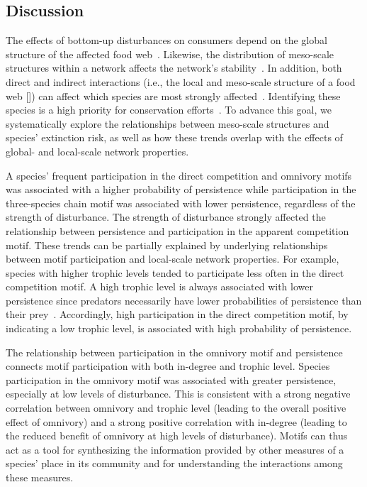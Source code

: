 \documentclass[12pt]{article}
\begin{document}
\begin{spacing}{2.0}
\section*{Discussion}

    The effects of bottom-up disturbances on consumers depend on the global structure of the affected food web~\citep{Dunne2002, Eklof2006, PascualDunne2006}.
    Likewise, the distribution of meso-scale structures within a network affects the network's stability~\citep{prill2005dynamic, bascompte2005simple}.
    In addition, both direct and indirect interactions (i.e., the local and meso-scale structure of a food web  [\citealp[]{Cirtwill2018FoodWebs}]) can affect which species are most strongly affected~\citep{curtsdotter2011robustness, dunne2009cascading, Eklof2006}. 
    Identifying these species is a high priority for conservation efforts~\citep{Bottrilletal2008}.
    To advance this goal, we systematically explore the relationships between meso-scale structures and species' extinction risk, as well as how these trends overlap with the effects of global- and local-scale network properties.

    
    A species' frequent participation in the direct competition and omnivory motifs was associated with a higher probability of persistence while participation in the three-species chain motif was associated with lower persistence, regardless of the strength of disturbance.
    The strength of disturbance strongly affected the relationship between persistence and participation in the apparent competition motif.
    These trends can be partially explained by underlying relationships between motif participation and local-scale network properties.
    For example, species with higher trophic levels tended to participate less often in the direct competition motif.
    A high trophic level is always associated with lower persistence since predators necessarily have lower probabilities of persistence than their prey~\citep{Eklof2013}.
    Accordingly, high participation in the direct competition motif, by indicating a low trophic level, is associated with high probability of persistence.
    
    
    The relationship between participation in the omnivory motif and persistence connects motif participation with both in-degree and trophic level.
    Species participation in the omnivory motif was associated with greater persistence, especially at low levels of disturbance.
    This is consistent with a strong negative correlation between omnivory and trophic level (leading to the overall positive effect of omnivory) and a strong positive correlation with in-degree (leading to the reduced benefit of omnivory at high levels of disturbance). 
    Motifs can thus act as a tool for synthesizing the information provided by other measures of a species' place in its community and for understanding the interactions among these measures.
    

\end{spacing}
\end{document}
